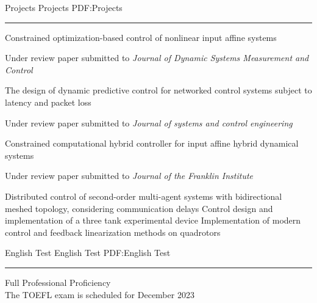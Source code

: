 \documentclass[letterpaper,MMMyyyy]{ResumeTemplate}
\begin{document}
\begin{Body}
\Section
{Projects}
{Projects}
{PDF:Projects}
\textcolor{Forestg}{\vspace{0.05cm}\hrule height 0.1cm}\BigGap
\vspace{5pt}
\BulletItem
Constrained optimization-based control of nonlinear input affine systems 
\begin{Detail}
	\SubBulletItem Under review paper submitted to \textit{Journal of Dynamic Systems Measurement and Control}
\end{Detail}
\vspace{5pt}
\BulletItem
The design of dynamic predictive control for networked control systems subject to latency and packet loss
\begin{Detail}
	\SubBulletItem Under review paper submitted to \textit{Journal of systems and control engineering}
\end{Detail}
\vspace{5pt}
\BulletItem
Constrained computational hybrid controller for input affine hybrid dynamical systems
\begin{Detail}
	\SubBulletItem Under review paper submitted to \textit{Journal of the Franklin Institute}
\end{Detail}
\vspace{5pt}
\BulletItem
Distributed control of second-order multi-agent systems with bidirectional meshed topology, considering communication delays
\vspace{5pt}
\BulletItem
Control design and implementation of a three tank experimental device
\vspace{5pt}
\BulletItem
Implementation of modern control and feedback linearization methods on quadrotors

\Section
{English Test}
{English Test}
{PDF:English Test}
\textcolor{Forestg}{\vspace{0.05cm}\hrule height 0.1cm}\BigGap
\BulletItem
Full Professional Proficiency 
\\
The TOEFL exam is scheduled for December 2023



\end{Body}
\end{document}
